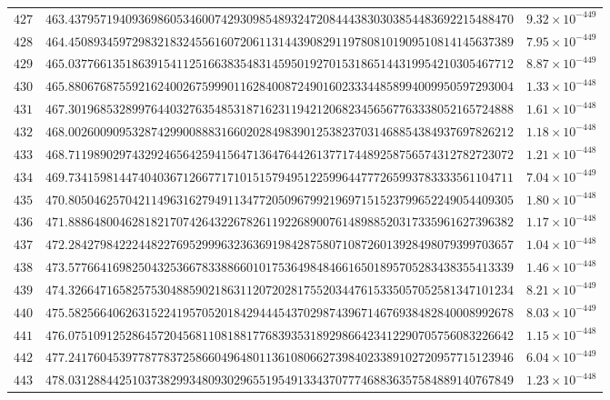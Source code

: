 \documentclass[12pt,reqno]{amsart}
\theoremstyle{remark}
\begin{document}
\begin{longtable}{clc}
$427$ & $463.4379571940936986053460074293098548932472084443830303854483692215488470$ & $9.32\times 10^{-449}$ \\
$428$ & $464.4508934597298321832455616072061131443908291197808101909510814145637389$ & $7.95\times 10^{-449}$ \\
$429$ & $465.0377661351863915411251663835483145950192701531865144319954210305467712$ & $8.87\times 10^{-449}$ \\
$430$ & $465.8806768755921624002675999011628400872490160233344858994009950597293004$ & $1.33\times 10^{-448}$ \\
$431$ & $467.3019685328997644032763548531871623119421206823456567763338052165724888$ & $1.61\times 10^{-448}$ \\
$432$ & $468.0026009095328742990088831660202849839012538237031468854384937697826212$ & $1.18\times 10^{-448}$ \\
$433$ & $468.7119890297432924656425941564713647644261377174489258756574312782723072$ & $1.21\times 10^{-448}$ \\
$434$ & $469.7341598144740403671266771710151579495122599644777265993783333561104711$ & $7.04\times 10^{-449}$ \\
$435$ & $470.8050462570421149631627949113477205096799219697151523799652249054409305$ & $1.80\times 10^{-448}$ \\
$436$ & $471.8886480046281821707426432267826119226890076148988520317335961627396382$ & $1.17\times 10^{-448}$ \\
$437$ & $472.2842798422244822769529996323636919842875807108726013928498079399703657$ & $1.04\times 10^{-448}$ \\
$438$ & $473.5776641698250432536678338866010175364984846616501895705283438355413339$ & $1.46\times 10^{-448}$ \\
$439$ & $474.3266471658257530488590218631120720281755203447615335057052581347101234$ & $8.21\times 10^{-449}$ \\
$440$ & $475.5825664062631522419570520184294445437029874396714676938482840008992678$ & $8.03\times 10^{-449}$ \\
$441$ & $476.0751091252864572045681108188177683935318929866423412290705756083226642$ & $1.15\times 10^{-448}$ \\
$442$ & $477.2417604539778778372586604964801136108066273984023389102720957715123946$ & $6.04\times 10^{-449}$ \\
$443$ & $478.0312884425103738299348093029655195491334370777468836357584889140767849$ & $1.23\times 10^{-448}$ \\

\end{longtable}
\end{document}
